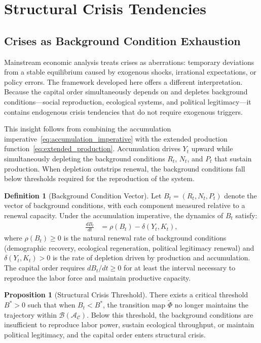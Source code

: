 \documentclass[12pt,a4paper]{article}
\theoremstyle{definition}
\newtheorem{definition}{Definition}[section]
\newtheorem{proposition}{Proposition}[section]
\theoremstyle{remark}
\begin{document}
\section{Structural Crisis Tendencies}
\label{sec:crisis}

\subsection{Crises as Background Condition Exhaustion}

Mainstream economic analysis treats crises as aberrations: temporary deviations from a stable equilibrium caused by exogenous shocks, irrational expectations, or policy errors. The framework developed here offers a different interpretation. Because the capital order simultaneously depends on and depletes background conditions---social reproduction, ecological systems, and political legitimacy---it contains endogenous crisis tendencies that do not require exogenous triggers.

This insight follows from combining the accumulation imperative~\eqref{eq:accumulation_imperative} with the extended production function~\eqref{eq:extended_production}. Accumulation drives $Y_t$ upward while simultaneously depleting the background conditions $R_t$, $N_t$, and $P_t$ that sustain production. When depletion outstrips renewal, the background conditions fall below thresholds required for the reproduction of the system.

\begin{definition}[Background Condition Vector]
Let $B_t = (R_t, N_t, P_t)$ denote the vector of background conditions, with each component measured relative to a renewal capacity. Under the accumulation imperative, the dynamics of $B_t$ satisfy:
\begin{align}
  \label{eq:B_dynamics}
  \frac{dB_t}{dt} &= \rho(B_t) - \delta(Y_t, K_t),
\end{align}
where $\rho(B_t) \geq 0$ is the natural renewal rate of background conditions (demographic recovery, ecological regeneration, political legitimacy renewal) and $\delta(Y_t, K_t) > 0$ is the rate of depletion driven by production and accumulation. The capital order requires $dB_t/dt \geq 0$ for at least the interval necessary to reproduce the labor force and maintain productive capacity.
\end{definition}

\begin{proposition}[Structural Crisis Threshold]
There exists a critical threshold $B^* > 0$ such that when $B_t < B^*$, the transition map $\tilde\Phi$ no longer maintains the trajectory within $\mathcal{B}(\mathcal{A}_\mathcal{C})$. Below this threshold, the background conditions are insufficient to reproduce labor power, sustain ecological throughput, or maintain political legitimacy, and the capital order enters structural crisis.
\end{proposition}
\end{document}
